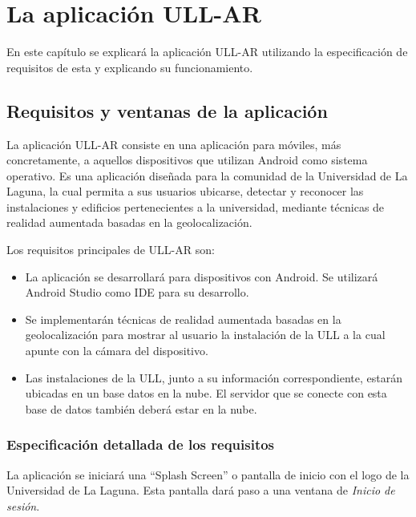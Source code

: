 
%
%
%

\chapter{La aplicación ULL-AR} \label{chap:LaAplicacion} 

En este capítulo se explicará la aplicación ULL-AR utilizando la especificación de requisitos de esta y explicando su funcionamiento.

\section{Requisitos y ventanas de la aplicación} %

La aplicación ULL-AR consiste en una aplicación para móviles, más concretamente, a aquellos dispositivos que utilizan Android como sistema operativo. Es una aplicación diseñada para la comunidad de la Universidad de La Laguna, la cual permita a sus usuarios ubicarse, detectar y reconocer las instalaciones y edificios pertenecientes a la universidad, mediante técnicas de realidad aumentada basadas en la geolocalización.

Los requisitos principales de ULL-AR son:
\begin{itemize}
    \item La aplicación se desarrollará para dispositivos con Android. Se utilizará Android Studio como IDE para su desarrollo.
    \item Se implementarán técnicas de realidad aumentada basadas en la geolocalización para mostrar al usuario la instalación de la ULL a la cual apunte con la cámara del dispositivo.
    \item Las instalaciones de la ULL, junto a su información correspondiente, estarán ubicadas en un base datos en la nube. El servidor que se conecte con esta base de datos también deberá estar en la nube.
\end{itemize}

\subsection{Especificación detallada de los requisitos} 

La aplicación se iniciará una ``Splash Screen'' \cite{URL::SplashScreen} o pantalla de inicio con el logo de la Universidad de La Laguna. Esta pantalla dará paso a una ventana de \textit{Inicio de sesión}.

